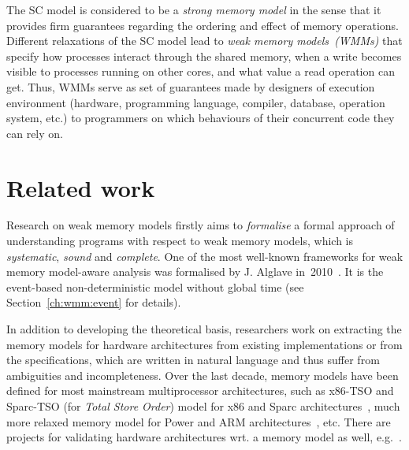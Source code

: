 The SC model is considered to be a \textit{strong memory model} in the sense that it provides firm guarantees regarding the ordering and effect of memory operations.
Different relaxations of the SC model lead to \textit{weak memory models~(WMMs)} that specify how processes interact through the shared memory, when a write becomes visible to processes running on other cores, and what value a read operation can get.
Thus, WMMs serve as set of guarantees made by designers of execution environment (hardware, programming language, compiler, database, operation system, etc.) to programmers on which behaviours of their concurrent code they can rely on.


\section{Related work}
\label{ch:intro:related}

Research on weak memory models firstly aims to \textit{formalise} a formal approach of understanding programs with respect to weak memory models, which is \textit{systematic}, \textit{sound} and \textit{complete}.
One of the most well-known frameworks for weak memory model-aware analysis was formalised by J. Alglave in~2010~\cite{alglave2010shared}.
It is the event-based non-deterministic model without global time (see Section~\ref{ch:wmm:event} for details).

In addition to developing the theoretical basis, researchers work on extracting the memory models for hardware architectures from existing implementations or from the specifications, which are written in natural language and thus suffer from ambiguities and incompleteness.
Over the last decade, memory models have been defined for most mainstream multiprocessor architectures, such as x86-TSO and Sparc-TSO (for \textit{Total Store Order}) model for x86 and Sparc architectures~\cite{owens2009better}, much more relaxed memory model for Power and ARM architectures~\cite{alglave2009semantics,sarkar2011understanding, alglave2014herding}, etc. %
There are projects for validating hardware architectures wrt. a memory model as well, e.g.~\cite{lustig2014pipecheck,lustig2016coatcheck}.


